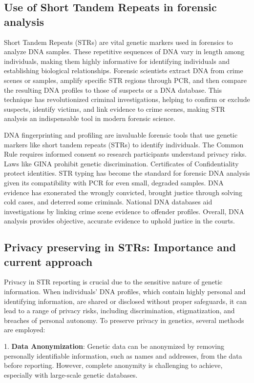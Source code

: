 \documentclass{article}
\begin{document}
\subsection{Use of Short Tandem Repeats in forensic analysis}
Short Tandem Repeats (STRs) are vital genetic markers used in forensics to analyze DNA samples. These repetitive sequences of DNA vary in length among individuals, making them highly informative for identifying individuals and establishing biological relationships. Forensic scientists extract DNA from crime scenes or samples, amplify specific STR regions through PCR, and then compare the resulting DNA profiles to those of suspects or a DNA database. This technique has revolutionized criminal investigations, helping to confirm or exclude suspects, identify victims, and link evidence to crime scenes, making STR analysis an indispensable tool in modern forensic science.

DNA fingerprinting and profiling are invaluable forensic tools that use genetic markers like short tandem repeats (STRs) to identify individuals. The Common Rule requires informed consent so research participants understand privacy risks. Laws like GINA prohibit genetic discrimination. Certificates of Confidentiality protect identities. STR typing has become the standard for forensic DNA analysis given its compatibility with PCR for even small, degraded samples. DNA evidence has exonerated the wrongly convicted, brought justice through solving cold cases, and deterred some criminals. National DNA databases aid investigations by linking crime scene evidence to offender profiles. Overall, DNA analysis provides objective, accurate evidence to uphold justice in the courts.

\subsection{Privacy preserving in STRs: Importance and current approach}

Privacy in STR reporting is crucial due to the sensitive nature of genetic information. When individuals' DNA profiles, which contain highly personal and identifying information, are shared or disclosed without proper safeguards, it can lead to a range of privacy risks, including discrimination, stigmatization, and breaches of personal autonomy. To preserve privacy in genetics, several methods are employed:

1. \textbf{Data Anonymization}: Genetic data can be anonymized by removing personally identifiable information, such as names and addresses, from the data before reporting. However, complete anonymity is challenging to achieve, especially with large-scale genetic databases.
\end{document}

